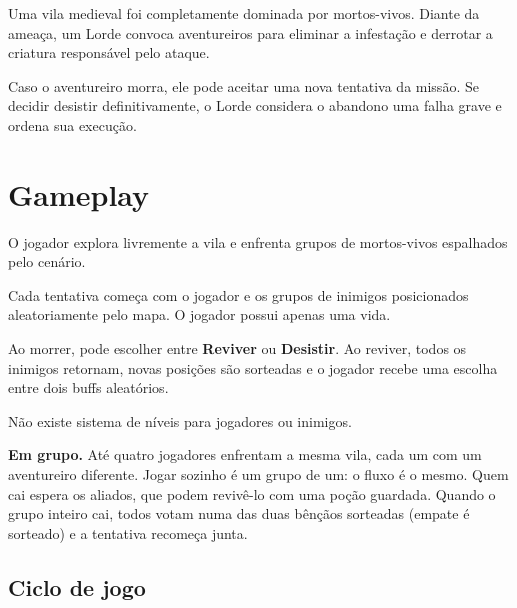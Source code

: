 \documentclass[11pt,a4paper]{article}
\begin{document}
Uma vila medieval foi completamente dominada por mortos-vivos. Diante da ameaça, um Lorde convoca aventureiros para eliminar a infestação e derrotar a criatura responsável pelo ataque.

Caso o aventureiro morra, ele pode aceitar uma nova tentativa da missão. Se decidir desistir definitivamente, o Lorde considera o abandono uma falha grave e ordena sua execução.

\section{Gameplay}

O jogador explora livremente a vila e enfrenta grupos de mortos-vivos espalhados pelo cenário.

Cada tentativa começa com o jogador e os grupos de inimigos posicionados aleatoriamente pelo mapa. O jogador possui apenas uma vida.

Ao morrer, pode escolher entre \textbf{Reviver} ou \textbf{Desistir}. Ao reviver, todos os inimigos retornam, novas posições são sorteadas e o jogador recebe uma escolha entre dois buffs aleatórios.

Não existe sistema de níveis para jogadores ou inimigos.

\textbf{Em grupo.} Até quatro jogadores enfrentam a mesma vila, cada um com um aventureiro diferente. Jogar sozinho é um grupo de um: o fluxo é o mesmo. Quem cai espera os aliados, que podem revivê-lo com uma poção guardada. Quando o grupo inteiro cai, todos votam numa das duas bênçãos sorteadas (empate é sorteado) e a tentativa recomeça junta.

\subsection{Ciclo de jogo}
\end{document}
